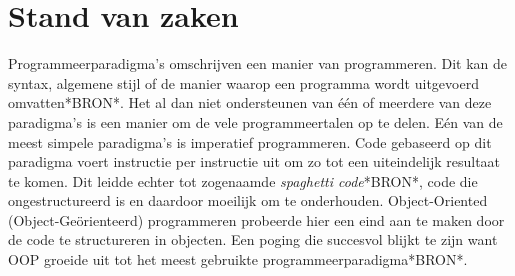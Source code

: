 \chapter{Stand van zaken}
\label{ch:stand-van-zaken}






Programmeerparadigma's omschrijven een manier van programmeren. Dit kan de syntax, algemene stijl of de manier waarop een programma wordt uitgevoerd omvatten*BRON*. Het al dan niet ondersteunen van één of meerdere van deze paradigma's is een manier om de vele programmeertalen op te delen. Eén van de meest simpele paradigma's is imperatief programmeren. Code gebaseerd op dit paradigma voert instructie per instructie uit om zo tot een uiteindelijk resultaat te komen. Dit leidde echter tot zogenaamde \textit{spaghetti code}*BRON*, code die ongestructureerd is en daardoor moeilijk om te onderhouden. Object-Oriented (Object-Geörienteerd) programmeren probeerde hier een eind aan te maken door de code te structureren in objecten. Een poging die succesvol blijkt te zijn want OOP groeide uit tot het meest gebruikte programmeerparadigma*BRON*. 

